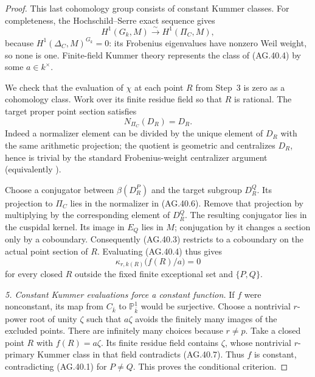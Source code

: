 \begin{proof}
This last cohomology group consists of constant
Kummer classes. For completeness, the
Hochschild--Serre exact sequence gives
\[
 H^1(G_k,M)\xrightarrow{\sim}H^1(\Pi_C,M),
                                                        \tag{AG.40.5}
\]
because \(H^1(\Delta_C,M)^{G_k}=0\): its
Frobenius eigenvalues have nonzero Weil weight,
so none is one. Finite-field
Kummer theory represents the class of (AG.40.4) by
some \(a\in k^\times\).

We check that the evaluation of \(\chi\) at
each point \(R\) from Step~3 is zero as a
cohomology class. Work over its finite residue
field so that \(R\) is rational. The target
proper point section satisfies
\[
                       N_{\Pi_C}(D_R)=D_R.
                                                        \tag{AG.40.6}
\]
Indeed a normalizer element can be divided by
the unique element of \(D_R\) with the same
arithmetic projection; the quotient is geometric
and centralizes \(D_R\), hence is trivial by
the standard Frobenius-weight centralizer
argument (equivalently
\cite[Lemma~1.7]{AR_ST2009}).

Choose a conjugator between
\(\beta(D_R^P)\) and the target subgroup
\(D_R^Q\). Its projection to \(\Pi_C\)
lies in the normalizer in (AG.40.6). Remove that
projection by multiplying by the corresponding
element of \(D_R^Q\). The resulting conjugator
lies in the cuspidal kernel. Its image in
\(E_Q\) lies in \(M\); conjugation by it
changes a section only by a coboundary.
Consequently (AG.40.3) restricts to a coboundary
on the actual point section of \(R\).
Evaluating (AG.40.4) thus gives
\[
       \kappa_{r,k(R)}\bigl(f(R)/a\bigr)=0
                                                        \tag{AG.40.7}
\]
for every closed \(R\) outside the fixed finite
exceptional set and \(\{P,Q\}\).

\emph{5. Constant Kummer evaluations force a
constant function.}
If \(f\) were nonconstant, its map from
\(C_{\bar k}\) to \(\mathbb P^1_{\bar k}\)
would be surjective. Choose a nontrivial
\(r\)-power root of unity \(\zeta\) such that
\(a\zeta\) avoids the finitely many images
of the excluded points. There are infinitely
many choices because \(r\ne p\).
Take a closed point \(R\) with
\(f(R)=a\zeta\). Its finite residue field
contains \(\zeta\), whose nontrivial
\(r\)-primary Kummer class in that field
contradicts (AG.40.7). Thus \(f\) is constant,
contradicting (AG.40.1) for \(P\ne Q\).
This proves the conditional criterion.
\end{proof}

